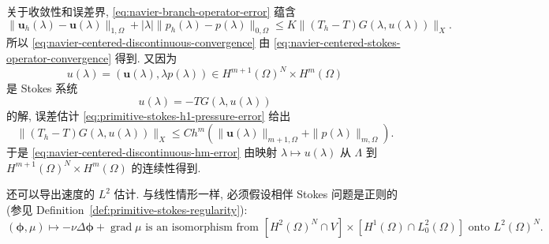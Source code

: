 \begin{Proof}
关于收敛性和误差界, \eqref{eq:navier-branch-operator-error} 蕴含
\[
\|\boldsymbol u_h(\lambda)-\boldsymbol u(\lambda)\|_{1,\Omega}
+|\lambda|\|p_h(\lambda)-p(\lambda)\|_{0,\Omega}
\leq K\|(T_h-T)G(\lambda,u(\lambda))\|_X.
\]
所以 \eqref{eq:navier-centered-discontinuous-convergence} 由
\eqref{eq:navier-centered-stokes-operator-convergence} 得到. 又因为
\[
u(\lambda)=(\boldsymbol u(\lambda),\lambda p(\lambda))
\in H^{m+1}(\Omega)^N\times H^m(\Omega)
\]
是 Stokes 系统
\[
u(\lambda)=-TG(\lambda,u(\lambda))
\]
的解, 误差估计 \eqref{eq:primitive-stokes-h1-pressure-error} 给出
\[
\|(T_h-T)G(\lambda,u(\lambda))\|_X
\leq Ch^m\left(
\|\boldsymbol u(\lambda)\|_{m+1,\Omega}
+\|p(\lambda)\|_{m,\Omega}\right).
\]
于是 \eqref{eq:navier-centered-discontinuous-hm-error} 由映射
$\lambda\mapsto u(\lambda)$ 从 $\Lambda$ 到
$H^{m+1}(\Omega)^N\times H^m(\Omega)$ 的连续性得到.
\end{Proof}

还可以导出速度的 $L^2$ 估计. 与线性情形一样, 必须假设相伴 Stokes 问题是正则的
(参见 Definition~\ref{def:primitive-stokes-regularity}):
\begin{equation}\label{eq:navier-centered-stokes-regularity}
(\boldsymbol\phi,\mu)\mapsto
-\nu\Delta\boldsymbol\phi+\operatorname{grad}\mu
\text{ is an isomorphism from }
[H^2(\Omega)^N\cap V]\times[H^1(\Omega)\cap L_0^2(\Omega)]
\text{ onto }L^2(\Omega)^N.
\end{equation}

